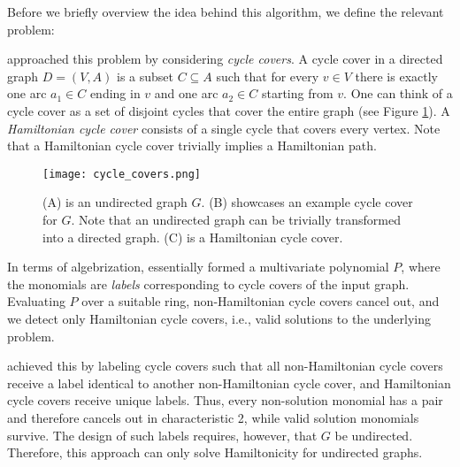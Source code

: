 Before we briefly overview the idea behind this algorithm, we define the 
relevant problem:
\begin{problem}
\end{problem}

\citeauthor{Björklund14} approached this problem by considering \emph{cycle covers}. 
A cycle cover in a directed graph $D = (V, A)$ is a 
subset $C \subseteq A$ such that for every $v \in V$ there is exactly one arc $a_1 \in C$ ending in $v$ 
and one arc $a_2 \in C$ starting from $v$. One can think of a cycle cover as a set of disjoint 
cycles that cover the entire graph (see Figure \ref{fig:cycle_covers}). 
A \emph{Hamiltonian cycle cover} consists of a single cycle that covers every vertex. 
Note that a Hamiltonian cycle cover trivially implies a Hamiltonian path.

\begin{figure}[h]
  \texttt{[image: cycle\_covers.png]}
  \centering
  \caption{(A) is an undirected graph $G$. (B) showcases an example cycle cover for $G$. 
  Note that an undirected graph can be trivially transformed into a directed graph. 
  (C) is a Hamiltonian cycle cover.}
  \label{fig:cycle_covers}
\end{figure}

In terms of algebrization, 
\citeauthor{Björklund14} essentially formed 
a multivariate polynomial $P$, where the monomials are 
\emph{labels} corresponding 
to cycle covers of the input graph. Evaluating $P$ over a suitable ring, 
non-Hamiltonian cycle covers cancel out, and we detect 
only Hamiltonian cycle covers, i.e., valid solutions to the underlying problem.

\citeauthor{Björklund14} achieved this by labeling cycle covers such 
that all non-Hamiltonian cycle covers receive a label identical 
to another non-Hamiltonian cycle cover, 
and Hamiltonian cycle covers receive unique labels. 
Thus, every non-solution monomial has a pair and therefore 
cancels out in characteristic 2, while valid solution monomials survive. 
The design of such labels requires, however, that $G$ be undirected. 
Therefore, this approach can only solve Hamiltonicity for undirected graphs.

